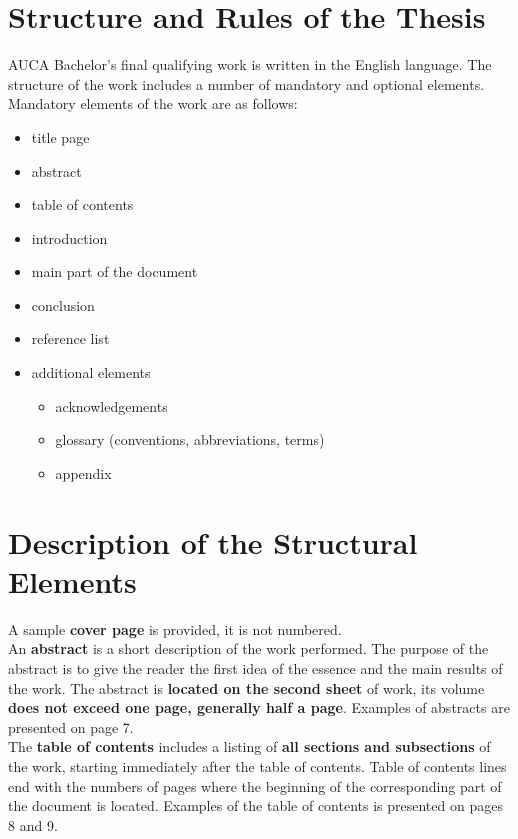 \documentclass[a4paper, 12pt]{article}
\begin{document}
\section*{Structure and Rules of the Thesis}

AUCA Bachelor's final qualifying work is written in the English language. The 
structure of the work includes a number of mandatory and optional elements. 
Mandatory elements of the work are as follows:

\begin{itemize}
    \item title page
    \item abstract
    \item table of contents
    \item introduction
    \item main part of the document
    \item conclusion
    \item reference list
    \item additional elements
        \begin{itemize}
            \item acknowledgements
            \item glossary (conventions, abbreviations, terms)
            \item appendix
        \end{itemize}
\end{itemize}

\section*{Description of the Structural Elements}

A sample \textbf{cover page} is provided, it is not numbered.\\

An \textbf{abstract} is a short description of the work performed. The purpose of 
the abstract is to give the reader the first idea of the essence and the main 
results of the work. The abstract is \textbf{located on the second sheet} of work, 
its volume \textbf{does not exceed one page, generally half a page}. Examples of 
abstracts are presented on page 7.\\

The \textbf{table of contents} includes a listing of \textbf{all sections and
subsections}  of the work, starting immediately after the table of contents. 
Table of contents lines end with the numbers of pages where the beginning of 
the corresponding part of the document is located. Examples of the table of 
contents is presented on pages 8 and 9.\\
\end{document}
